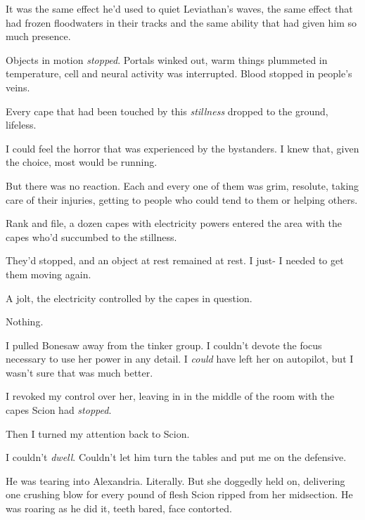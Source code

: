 It was the same effect he'd used to quiet Leviathan's waves, the same effect that had frozen floodwaters in their tracks and the same ability that had given him so much presence.



Objects in motion \emph{stopped}.  Portals winked out, warm things plummeted in temperature, cell and neural activity was interrupted.  Blood stopped in people's veins.



Every cape that had been touched by this \emph{stillness} dropped to the ground, lifeless.



I could feel the horror that was experienced by the bystanders.  I knew that, given the choice, most would be running.



But there was no reaction.  Each and every one of them was grim, resolute, taking care of their injuries, getting to people who could tend to them or helping others.



Rank and file, a dozen capes with electricity powers entered the area with the capes who'd succumbed to the stillness.



They'd stopped, and an object at rest remained at rest.  I just- I needed to get them moving again.



A jolt, the electricity controlled by the capes in question.



Nothing.



I pulled Bonesaw away from the tinker group.  I couldn't devote the focus necessary to use her power in any detail.  I \emph{could} have left her on autopilot, but I wasn't sure that was much better.



I revoked my control over her, leaving in in the middle of the room with the capes Scion had \emph{stopped}.



Then I turned my attention back to Scion.



I couldn't \emph{dwell}.  Couldn't let him turn the tables and put me on the defensive.



He was tearing into Alexandria.  Literally.  But she doggedly held on, delivering one crushing blow for every pound of flesh Scion ripped from her midsection.  He was roaring as he did it, teeth bared, face contorted.



